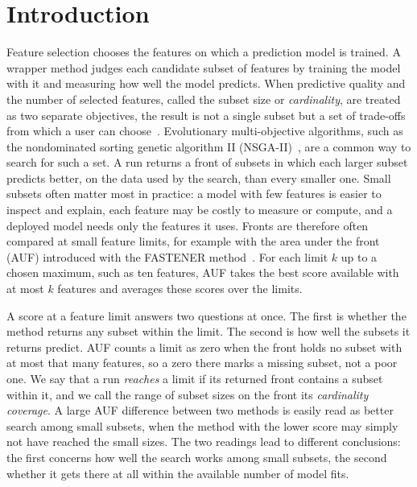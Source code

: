 
\section{Introduction}
\label{sec:introduction}

Feature selection chooses the features on which a prediction model is trained. A wrapper method judges each candidate subset of features by training the model with it and measuring how well the model predicts. When predictive quality and the number of selected features, called the subset size or \emph{cardinality}, are treated as two separate objectives, the result is not a single subset but a set of trade-offs from which a user can choose~\cite{Xue2016Survey,Jiao2024Survey}. Evolutionary multi-objective algorithms, such as the nondominated sorting genetic algorithm II (NSGA-II)~\cite{Deb2002NSGAII}, are a common way to search for such a set. A run returns a front of subsets in which each larger subset predicts better, on the data used by the search, than every smaller one. Small subsets often matter most in practice: a model with few features is easier to inspect and explain, each feature may be costly to measure or compute, and a deployed model needs only the features it uses. Fronts are therefore often compared at small feature limits, for example with the area under the front (AUF) introduced with the FASTENER method~\cite{Koprivec2020}. For each limit $k$ up to a chosen maximum, such as ten features, AUF takes the best score available with at most $k$ features and averages these scores over the limits.

A score at a feature limit answers two questions at once. The first is whether the method returns any subset within the limit. The second is how well the subsets it returns predict. AUF counts a limit as zero when the front holds no subset with at most that many features, so a zero there marks a missing subset, not a poor one. We say that a run \emph{reaches} a limit if its returned front contains a subset within it, and we call the range of subset sizes on the front its \emph{cardinality coverage}. A large AUF difference between two methods is easily read as better search among small subsets, when the method with the lower score may simply not have reached the small sizes. The two readings lead to different conclusions: the first concerns how well the search works among small subsets, the second whether it gets there at all within the available number of model fits.

